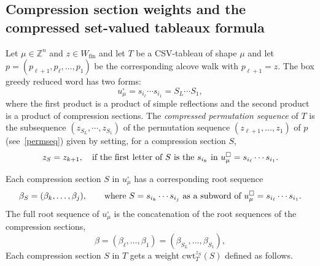 \documentclass[11pt]{article}
\theoremstyle{plain}
\theoremstyle{definition}
\theoremstyle{remark}
\numberwithin{equation}{section}
\def\ZZ{\mathbb{Z}}
\newcounter{r}
\newcounter{s}
\begin{document}
\subsection{Compression section weights and the compressed set-valued tableaux formula}\label{weights}

Let $\mu\in \ZZ^n$ and $z\in W_{\mathrm{fin}}$ and let $T$ be a CSV-tableau of shape $\mu$
and let $p=(p_{\ell+1}, p_\ell, \ldots, p_1)$ be the corresponding alcove walk with $p_{\ell+1}=z$.  The box greedy reduced word
has two forms:
\begin{equation}
u_\mu^\square = s_{i_\ell}\cdots s_{i_1} = S_L\cdots S_1,
\label{Cfact}
\end{equation}
where the first product is a product of simple reflections and the second product is a product of compression sections.
The \emph{compressed permutation sequence} of $T$ is the subsequence $(z_{S_L},\cdots, z_{S_1})$
of the permutation sequence $(z_{\ell+1}, \ldots, z_1)$ of $p$ (see~\eqref{permseq}) given by setting, for a compression section $S$,
$$z_S = z_{k+1},\quad\hbox{if the first letter of $S$ is the $s_{i_{k}}$ in $u_\mu^\square = s_{i_\ell}\cdots s_{i_1}$.}
$$

Each compression section $S$ in $u_\mu^\square$ has a corresponding root sequence
$$\beta_S = (\beta_k, \ldots, \beta_j),
\qquad\hbox{where $S=s_{i_k}\cdots s_{i_j}$ as a subword of $u_\mu^\square = s_{i_\ell}\cdots s_{i_1}$.}
$$
The full root sequence of $u_\mu^\square$ is the concatenation of the root sequences of the compression sections,
$$\beta = (\beta_\ell, \ldots, \beta_1)=(\beta_{S_L},\ldots, \beta_{S_1}),
$$
Each compression section $S$ in $T$ gets a weight $\mathrm{cwt}^{z_S}_T(S)$ defined as follows.
\end{document}
